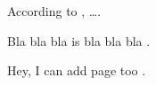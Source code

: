 \documentclass{article}
\begin{document}
    
According to \cite{lamport1994latex}, \dots.

Bla bla bla is bla bla bla \cite{griffiths1997learning, 
    goossens1997latex}.

Hey, I can add page too \cite[p.~32]{lamport1994latex}.



    
\end{document}
